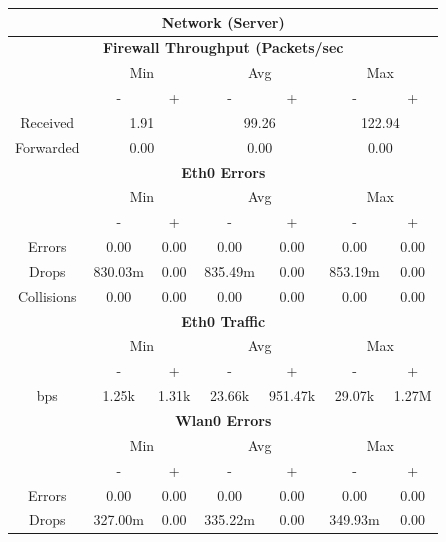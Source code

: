 \documentclass[11pt,a4paper,headinclude=false,footinclude=false]{scrreprt}
\begin{document}
\begin{table}[H]
\centering
    \begin{tabular}{||c|c|c|c|c|c|c||}
    \hline
    \multicolumn{7}{|c|}{\textbf{Network (Server)}} \\
    \hline
    \multicolumn{7}{|c|}{\textbf{Firewall Throughput (Packets/sec}} \\
    \hline\hline
      & \multicolumn{2}{|c|}{Min} & \multicolumn{2}{|c|}{Avg} & \multicolumn{2}{|c|}{Max} \\
    \hline
      & - & + & - & + & - & + \\
    \hline
    Received & \multicolumn{2}{|c|}{1.91} & \multicolumn{2}{|c|}{99.26} & \multicolumn{2}{|c|}{122.94} \\
    \hline
    Forwarded & \multicolumn{2}{|c|}{0.00} & \multicolumn{2}{|c|}{0.00} & \multicolumn{2}{|c|}{0.00} \\
    \hline\hline
    \multicolumn{7}{|c|}{\textbf{Eth0 Errors}} \\
    \hline\hline
      & \multicolumn{2}{|c|}{Min} & \multicolumn{2}{|c|}{Avg} & \multicolumn{2}{|c|}{Max} \\
    \hline
     & - & + & - & + & - & + \\
    \hline
    Errors & 0.00 & 0.00 & 0.00 & 0.00 & 0.00 & 0.00 \\
    \hline
    Drops & 830.03m & 0.00 & 835.49m & 0.00 & 853.19m & 0.00 \\
    \hline
    Collisions & 0.00 & 0.00 & 0.00 & 0.00 & 0.00 & 0.00 \\
    \hline\hline
    \multicolumn{7}{|c|}{\textbf{Eth0 Traffic}} \\
    \hline\hline
      & \multicolumn{2}{|c|}{Min} & \multicolumn{2}{|c|}{Avg} & \multicolumn{2}{|c|}{Max} \\
    \hline
      & - & + & - & + & - & + \\
    \hline
    bps & 1.25k & 1.31k & 23.66k & 951.47k & 29.07k & 1.27M \\
    \hline\hline
    \multicolumn{7}{|c|}{\textbf{Wlan0 Errors}} \\
    \hline\hline
      & \multicolumn{2}{|c|}{Min} & \multicolumn{2}{|c|}{Avg} & \multicolumn{2}{|c|}{Max} \\
    \hline
      & - & + & - & + & - & + \\
    \hline
    Errors  & 0.00 & 0.00 & 0.00 & 0.00 & 0.00 & 0.00 \\
    \hline
    Drops & 327.00m & 0.00 & 335.22m & 0.00 & 349.93m & 0.00 \\

\end{tabular}
\end{table}
\end{document}
